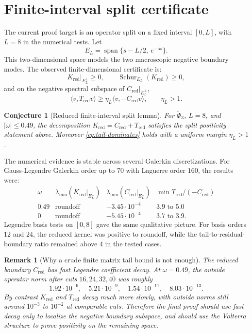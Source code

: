 \documentclass[11pt]{article}
\newtheorem{conjecture}[theorem]{Conjecture}
\newtheorem{remark}[theorem]{Remark}
\newcommand{\Span}{\operatorname{span}}
\newcommand{\Kred}{K_{\mathrm{red}}}
\newcommand{\Cred}{C_{\mathrm{red}}}
\newcommand{\Tred}{T_{\mathrm{red}}}
\newcommand{\EL}{E_L}
\begin{document}
\section{Finite-interval split certificate}

The current proof target is an operator split on a fixed interval
$[0,L]$, with $L=8$ in the numerical tests.  Let
\[
   \EL=\Span\{s-L/2,\ e^{-5s}\}.
\]
This two-dimensional space models the two macroscopic negative boundary modes.
The observed finite-dimensional certificate is:
\[
   \Kred|_{\EL^\perp}\ge 0,
   \qquad
   \operatorname{Schur}_{\EL}(\Kred)\ge 0,
\]
and on the negative spectral subspace of $\Cred|_{\EL^\perp}$,
\begin{equation}
   \langle v,\Tred v\rangle
   \ge
   \eta_L\langle v,-\Cred v\rangle,
   \qquad
   \eta_L>1.
   \label{eq:tail-dominates}
\end{equation}

\begin{conjecture}[Reduced finite-interval split lemma]
For $\widetilde\Phi_3$, $L=8$, and $|\omega|\le 0.49$, the decomposition
$\Kred=\Cred+\Tred$ satisfies the split positivity statement above.  Moreover
\eqref{eq:tail-dominates} holds with a uniform margin $\eta_L>1$.
\end{conjecture}

The numerical evidence is stable across several Galerkin discretizations.
For Gauss-Legendre Galerkin order up to $70$ with Laguerre order $160$, the
results were:
\[
\begin{array}{c|ccc}
\omega & \lambda_{\min}(\Kred|_{\EL^\perp})
       & \lambda_{\min}(\Cred|_{\EL^\perp})
       & \min \Tred/(-\Cred)\\
\hline
0.49 & \text{roundoff} & -3.45\cdot 10^{-4} & 3.9\text{ to }5.0\\
0    & \text{roundoff} & -5.45\cdot 10^{-4} & 3.7\text{ to }3.9.
\end{array}
\]
Legendre basis tests on $[0,8]$ gave the same qualitative picture.  For basis
orders $12$ and $24$, the reduced kernel was positive to roundoff, while the
tail-to-residual-boundary ratio remained above $4$ in the tested cases.

\begin{remark}[Why a crude finite matrix tail bound is not enough]
The reduced boundary $\Cred$ has fast Legendre coefficient decay.  At
$\omega=0.49$, the outside operator norm after cuts $16,24,32,40$ was roughly
\[
  1.92\cdot 10^{-6},\quad
  5.21\cdot 10^{-9},\quad
  1.54\cdot 10^{-11},\quad
  8.03\cdot 10^{-13}.
\]
By contrast $\Kred$ and $\Tred$ decay much more slowly, with outside norms
still around $10^{-3}$ to $10^{-2}$ at comparable cuts.  Therefore the final
proof should use fast decay only to localize the negative boundary subspace,
and should use the Volterra structure to prove positivity on the remaining
space.
\end{remark}
\end{document}
